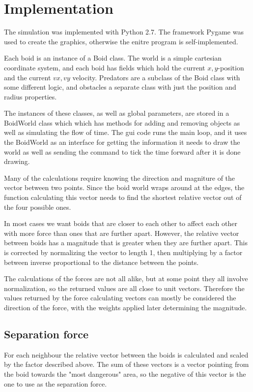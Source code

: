 \section*{Implementation}
The simulation was implemented with Python 2.7.
The framework Pygame was used to create the graphics, otherwise the enitre program is self-implemented.

Each boid is an instance of a Boid class.
The world is a simple cartesian coordinate system,
and each boid has fields which hold the current $x, y$-position and the current $vx, vy$ velocity.
Predators are a subclass of the Boid class with some different logic, and obstacles a separate class with just the position and radius properties.

The instances of these classes, as well as global parameters, are stored in a BoidWorld class which which has methods for adding and removing objects as well as simulating the flow of time.
The gui code runs the main loop,
and it uses the BoidWorld as an interface for getting the information it needs to draw the world as well as sending the command to tick the time forward after it is done drawing.

Many of the calculations require knowing the direction and magniture of the vector between two points.
Since the boid world wraps around at the edges, the function calculating this vector needs to find the shortest relative vector out of the four possible ones.

In most cases we want boids that are closer to each other to affect each other with more force than ones that are further apart.
However, the relative vector between boids has a magnitude that is greater when they are further apart.
This is corrected by normalizing the vector to length 1,
then multiplying by a factor between inverse proportional to the distance between the points.

The calculations of the forces are not all alike, but at some point they all involve normalization,
so the returned values are all close to unit vectors.
Therefore the values returned by the force calculating vectors can mostly be considered the direction of the force, with the weights applied later determining the magnitude.

\subsection*{Separation force}
For each neighbour the relative vector between the boids is calculated and scaled by the factor described above.
The sum of these vectors is a vector pointing from the boid towards the "most dangerous" area,
so the negative of this vector is the one to use as the separation force.

